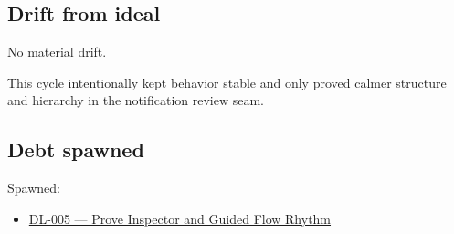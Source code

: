 \subsection{Drift from ideal}\label{record-171-drift-from-ideal}

No material drift.

This cycle intentionally kept behavior stable and only proved calmer structure and hierarchy in the notification review seam.

\subsection{Debt spawned}\label{record-171-debt-spawned}

Spawned:

\begin{itemize}
\tightlist
\item
  \href{https://github.com/flyingrobots/bijou/blob/cbd70612140e7a450d764b3c7be1c6af878b99bc/docs/method/graveyard/legacy-backlog/DL-005-prove-inspector-and-guided-flow-rhythm.md}{DL-005 --- Prove Inspector and Guided Flow Rhythm}
\end{itemize}

